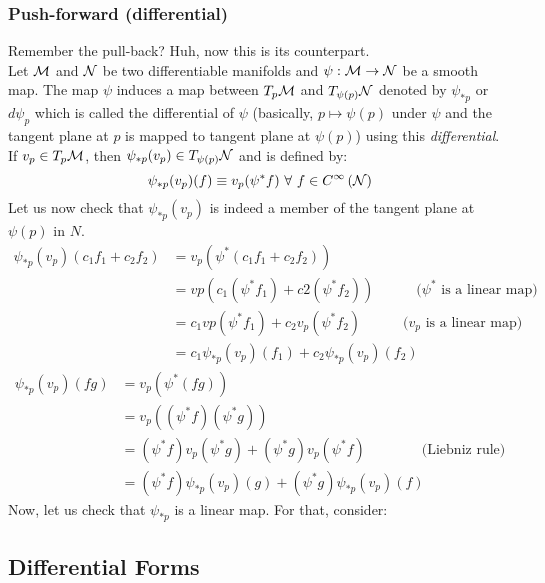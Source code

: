 \subsubsection{Push-forward (differential)}
Remember the pull-back? Huh, now this is its counterpart.\\[0.2cm]
Let $\mathcal M$ and $\mathcal N$ be two differentiable manifolds and $\psi: \mathcal M\rightarrow \mathcal N$ be a smooth map. The map $\psi$ induces a map between $T_p\mathcal M$ and $T_{\psi(p)}\mathcal N$ denoted by $\psi_{*p}$ or $d\psi_p$ which is called the differential of $\psi$ (basically, $p \mapsto \psi(p)$ under $\psi$ and the tangent plane at $p$ is mapped to tangent plane at $\psi(p)$) using this \textit{differential}. If $v_p\in T_p\mathcal M$, then $\psi_{*p}(v_p)\in T_{\psi(p)}\mathcal N$ and is defined by:
$$\psi_{*p}(v_p)(f) \equiv v_p(\psi^* f)\ \forall \ f\in \cty{\SN}$$
Let us now check that $\psi_{*p}(v_p)$ is indeed a member of the tangent plane at $\psi(p)$ in $N$. 
\begin{align*}
  \psi_{*p}(v_p)(c_1f_1 + c_2f_2) &= v_p(\psi^*(c_1f_1+c_2f_2))\\
  &=vp(c_1(\psi^*f_1) + c2(\psi^*f_2)) \qquad\quad \text{($\psi^*$ is a linear map)}\\
  &=c_1vp(\psi^*f_1) + c_2 v_p(\psi^*f_2) \qquad\quad \text{($v_p$ is a linear map)}\\
  &=c_1 \psi_{*p}(v_p)(f_1)+c_2 \psi_{*p}(v_p)(f_2)
\end{align*}
\begin{align*}
  \psi_{*p}(v_p)(fg) &= v_p(\psi^*(fg))\\
  &=v_p((\psi^*f)(\psi^*g))\\
  &=(\psi^*f)v_p(\psi^*g) +(\psi^*g)v_p(\psi^*f) \qquad\qquad \text{(Liebniz rule)}\\
  &= (\psi^*f)\psi_{*p}(v_p)(g) + (\psi^*g)\psi_{*p}(v_p)(f)
\end{align*}
Now, let us check that $\psi_{*p}$ is a linear map. For that, consider: 
\subsection{Differential Forms}
